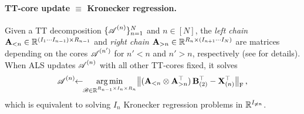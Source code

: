 \paragraph{TT-core update $\equiv$ Kronecker regression.}
Given a TT decomposition $\{\bm{\mathscr{A}}^{(n)}\}_{n=1}^{N}$ and $n\in[N]$,
the \emph{left chain} $\mathbf{A}_{<n} \in \mathbb{R}^{(I_1 \cdots I_{n-1}) \times R_{n-1}}$
and
\emph{right chain} $\mathbf{A}_{> n}\in \mathbb{R}^{R_n \times (I_{n+1} \cdots I_N)}$
are matrices depending on the cores $\bm{\mathscr{A}}^{(n')}$ for $n' < n$ and $n' > n$, respectively (see  for details).
When ALS updates $\bm{\mathscr{A}}^{(n)}$ with all other TT-cores fixed, it solves
\[
    \bm{\mathscr{A}}^{(n)} \!\!
    \gets \!\!
    \operatorname*{arg\,min}_{\bm{\mathscr{B}} \in \mathbb{R}^{R_{n-1}\times I_n \times R_n}}
    \bigl\lVert (\mathbf{A}_{<n}\otimes \mathbf{A}^\top_{>n})\,\mathbf{B}_{(2)}^\top - \mathbf{X}_{(n)}^\top \bigr\rVert_{\textnormal{F}}\,,
\]
which is equivalent to solving $I_n$ Kronecker regression problems in $\mathbb{R}^{I_{\neq n}}$.
